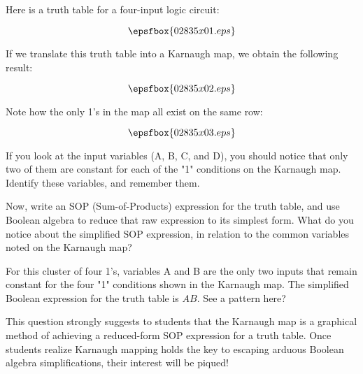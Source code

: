 

Here is a truth table for a four-input logic circuit:

$$\epsfbox{02835x01.eps}$$

If we translate this truth table into a Karnaugh map, we obtain the following result:

$$\epsfbox{02835x02.eps}$$

Note how the only 1's in the map all exist on the same row:

$$\epsfbox{02835x03.eps}$$

If you look at the input variables (A, B, C, and D), you should notice that only two of them are constant for each of the "1" conditions on the Karnaugh map.  Identify these variables, and remember them.

\vskip 10pt

Now, write an SOP (Sum-of-Products) expression for the truth table, and use Boolean algebra to reduce that raw expression to its simplest form.  What do you notice about the simplified SOP expression, in relation to the common variables noted on the Karnaugh map?







For this cluster of four 1's, variables A and B are the only two inputs that remain constant for the four "1" conditions shown in the Karnaugh map.  The simplified Boolean expression for the truth table is $AB$.  See a pattern here?







This question strongly suggests to students that the Karnaugh map is a graphical method of achieving a reduced-form SOP expression for a truth table.  Once students realize Karnaugh mapping holds the key to escaping arduous Boolean algebra simplifications, their interest will be piqued!




